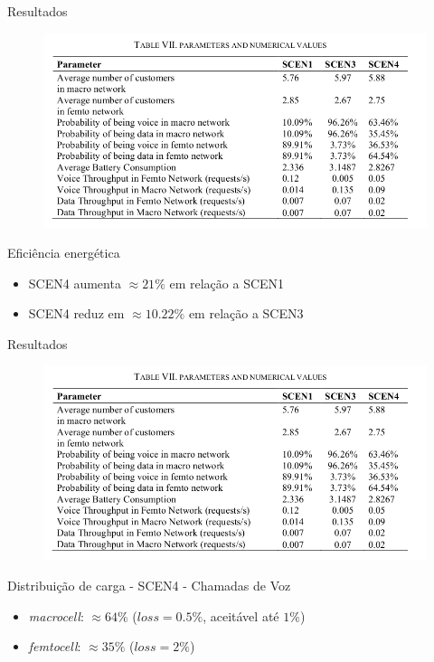 \begin{frame}{Resultados}
  \begin{figure}[h]
  	\begin{center}
      \includegraphics [scale=0.34]{./Figures/results}
  	\end{center}
  \end{figure}
  \begin{block}{Eficiência energética}
    \begin{itemize}
      \item SCEN4 aumenta $\approx 21\%$ em relação a SCEN1
      \item SCEN4 reduz em $\approx 10.22\%$ em relação a SCEN3
    \end{itemize}
  \end{block}
\end{frame}

\begin{frame}{Resultados}
  \begin{figure}[h]
  	\begin{center}
      \includegraphics [scale=0.34]{./Figures/results}
  	\end{center}
  \end{figure}
  \begin{block}{Distribuição de carga - SCEN4 - Chamadas de \alert{Voz}}
    \begin{itemize}
      \item \textit{macrocell}: $\approx 64\%$ ($loss = 0.5\%$, aceitável até
      $1\%$)
      \item \textit{femtocell}: $\approx 35\%$ ($loss = 2\%$)
    \end{itemize}
  \end{block}
\end{frame}

